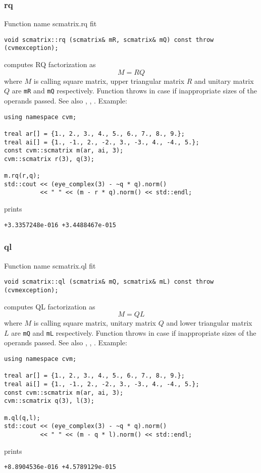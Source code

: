 \subsubsection{rq}
Function%
\pdfdest name {scmatrix.rq} fit
\begin{verbatim}
void scmatrix::rq (scmatrix& mR, scmatrix& mQ) const throw (cvmexception);
\end{verbatim}
computes RQ factorization as
\begin{equation*}
M=RQ
\end{equation*}
where 
$M$ is  calling square matrix, upper triangular matrix $R$ 
and unitary matrix $Q$ are \verb"mR" and \verb"mQ"
respectively. 
Function throws
in case if inappropriate sizes of the operands passed.
See also , ,
.
Example:
\begin{Verbatim}
using namespace cvm;

treal ar[] = {1., 2., 3., 4., 5., 6., 7., 8., 9.};
treal ai[] = {1., -1., 2., -2., 3., -3., 4., -4., 5.};
const cvm::scmatrix m(ar, ai, 3);
cvm::scmatrix r(3), q(3);

m.rq(r,q);
std::cout << (eye_complex(3) - ~q * q).norm()
          << " " << (m - r * q).norm() << std::endl;
\end{Verbatim}
prints
\begin{Verbatim}
+3.3357248e-016 +3.4488467e-015
\end{Verbatim}
\newpage




\subsubsection{ql}
Function%
\pdfdest name {scmatrix.ql} fit
\begin{verbatim}
void scmatrix::ql (scmatrix& mQ, scmatrix& mL) const throw (cvmexception);
\end{verbatim}
computes QL factorization as
\begin{equation*}
M=QL
\end{equation*}
where 
$M$ is  calling square matrix, unitary matrix $Q$ 
and lower triangular matrix $L$ are \verb"mQ" and \verb"mL"
respectively. 
Function throws
in case if inappropriate sizes of the operands passed.
See also , ,
.
Example:
\begin{Verbatim}
using namespace cvm;

treal ar[] = {1., 2., 3., 4., 5., 6., 7., 8., 9.};
treal ai[] = {1., -1., 2., -2., 3., -3., 4., -4., 5.};
const cvm::scmatrix m(ar, ai, 3);
cvm::scmatrix q(3), l(3);

m.ql(q,l);
std::cout << (eye_complex(3) - ~q * q).norm()
          << " " << (m - q * l).norm() << std::endl;
\end{Verbatim}
prints
\begin{Verbatim}
+8.8904536e-016 +4.5789129e-015
\end{Verbatim}
\newpage





